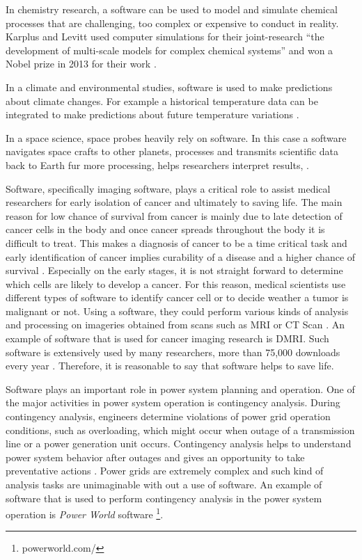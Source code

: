 In chemistry research, a software can be used to model and simulate chemical processes that are challenging, too complex or expensive to conduct in reality. Karplus and Levitt used computer simulations for their joint-research “the development of multi-scale models for complex chemical systems”  and won a Nobel prize in 2013 for their work \citep{storer2017bridging, andre2014nobel}. 

In a climate and environmental studies, software is used to make predictions about climate changes. For example a historical temperature data can be integrated to make predictions about future temperature variations \citep{storer2017bridging}.

In a space science, space probes heavily rely on software. In this case a software navigates space crafts to other planets, processes and transmits scientific data back to Earth fur more processing, helps researchers interpret results, \citep{lutz2011software}. 

Software, specifically imaging software, plays a critical role to assist medical researchers for early isolation of cancer and ultimately to saving life.  The main reason for low chance of survival from cancer is mainly due to late detection of cancer cells in the body  and once cancer spreads throughout the body it is difficult to treat. This makes a diagnosis of cancer to be a time critical task and early identification of cancer implies curability of a disease and a higher chance of survival \citep{wagner2004challenges}. Especially on the early stages, it is not straight forward to determine which cells are likely to develop a cancer. For this reason, medical scientists use different types of software to identify cancer cell or to decide weather a tumor is malignant or not. Using a software, they could perform various kinds of analysis and processing on imageries obtained from scans such as \ac{MRI} or \ac{CT} Scan \citep{al2012lung}. An example of software that is used for cancer imaging research is DMRI. Such software is extensively used by many researchers, more than 75,000 downloads every year \citep{norton2017slicerdmri}. Therefore, it is reasonable to say that software helps to save life.

Software plays an important role in power system planning and operation. One of the major activities in power system operation is contingency analysis. During contingency analysis, engineers determine violations of power grid operation conditions, such as overloading, which might occur when outage of a transmission line or a power generation unit occurs. Contingency analysis helps to understand power system behavior after outages and gives an opportunity to take preventative actions \citep{mishra2012contingency}. Power grids are extremely complex and such kind of analysis tasks are unimaginable with out a use of software. An example of software that is used to perform contingency analysis in the power system operation is \emph{Power World} software  \footnote{powerworld.com/}.  

